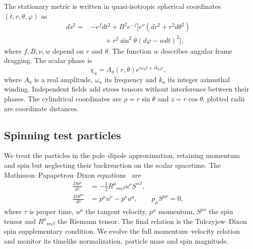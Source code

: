 \documentclass[10pt,twocolumn,floatfix,aps,prd,superscriptaddress,nofootinbib]{revtex4-2}
\begin{document}
The stationary metric is written in quasi-isotropic spherical coordinates
$(t,r,\theta,\varphi)$ as
\begin{equation}
\begin{split}
 ds^2={}&-e^fdt^2+B^2e^{-f}\bigl[e^\nu(dr^2+r^2d\theta^2)\\
       &\qquad+r^2\sin^2\theta(d\varphi-wdt)^2\bigr],
\end{split}
\label{eq:metric}
\end{equation}
where $f,B,\nu,w$ depend on $r$ and $\theta$. The function $w$ describes
angular frame dragging. The scalar phase is
\begin{equation}
 \chi_a=A_a(r,\theta)e^{i\omega_a t+ik_a\varphi},
 \label{eq:phase}
\end{equation}
where $A_a$ is a real amplitude, $\omega_a$ its frequency and $k_a$ its integer
azimuthal winding. Independent fields add stress tensors without interference
between their phases. The cylindrical coordinates are $\rho=r\sin\theta$
and $z=r\cos\theta$; plotted radii are coordinate distances.

\subsection{Spinning test particles}

We treat the particles in the pole--dipole approximation, retaining momentum
and spin but neglecting their backreaction on the scalar spacetime. The
Mathisson--Papapetrou--Dixon equations~\cite{song2023} are
\begin{align}
 \frac{Dp^\mu}{d\tau}&=-\frac12 R^\mu{}_{\nu\alpha\beta}
                         u^\nu S^{\alpha\beta},\label{eq:mpdforce}\\
 \frac{DS^{\mu\nu}}{d\tau}&=p^\mu u^\nu-p^\nu u^\mu,
 \qquad p_\mu S^{\mu\nu}=0,\label{eq:mpdspin}
\end{align}
where $\tau$ is proper time, $u^\mu$ the tangent velocity, $p^\mu$ momentum,
$S^{\mu\nu}$ the spin tensor and $R^\mu{}_{\nu\alpha\beta}$ the Riemann
tensor. The final relation is the Tulczyjew--Dixon spin supplementary
condition. We evolve the full momentum--velocity relation and monitor its
timelike normalization, particle mass and spin magnitude.
\end{document}
